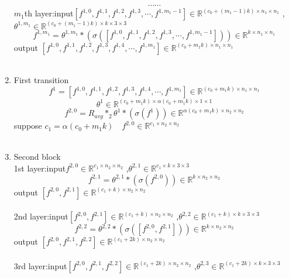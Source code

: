 \begin{enumerate}
\\ \hspace*{\fill} \\
$$\cdots\cdots$$
$m_1$th layer:\quad input$[f^{1,0},f^{1,1},f^{1,2},f^{1,3},\cdots,f^{1,m_1-1}] \in \mathbb{R}^{(c_0+(m_1-1)k)\times n_1\times n_1}$ ,$\theta^{1,m_1} \in \mathbb{R}^{ (c_0+(m_1-1)k)\times k\times3\times 3}$
$$ f^{1,m_1}=\theta^{1,m_1} \ast (\sigma([f^{1,0},f^{1,1},f^{1,2},f^{1,3},\cdots,f^{1,m_1-1}]))\in \mathbb{R}^{k\times n_1\times n_1}$$
\quad\quad\quad\quad\quad output $[f^{1,0},f^{1,1}, f^{1,2},f^{1,3},f^{1,4},\cdots,f^{1,m_1}] \in \mathbb{R}^{(c_0+m_1k)\times n_1\times n_1}$
\\ \hspace*{\fill} \\
\item First transition
$$f^1 = [f^{1,0},f^{1,1}, f^{1,2},f^{1,3},f^{1,4},\cdots,f^{1,m_1}] \in \mathbb{R}^{(c_0+m_1k)\times n_1\times n_1}$$
$$\theta^1 \in \mathbb{R}^{(c_0+m_1k)\times \alpha(c_0+m_1k)\times 1\times 1 }$$
$$f^{2,0}=R_{avg} \ast_2 \theta^{1} \ast (\sigma(f^1))\in \mathbb{R}^{\alpha(c_0+m_1k)\times n_2\times n_2}$$
suppose $c_1 = \alpha(c_0+m_1k)\quad f^{2,0}\in \mathbb{R}^{c_1\times n_2\times n_2}$
\\ \hspace*{\fill} \\
\item Second block\\
1st layer:\quad input$f^{2,0}\in \mathbb{R}^{c_1\times n_2\times n_2}$ ,$\theta^{2,1} \in \mathbb{R}^{c_1\times k\times3\times 3 }$
$$f^{2,1}=\theta^{2,1} \ast (\sigma(f^{2,0}))\in \mathbb{R}^{k\times n_2\times n_2}$$
\quad\quad\quad\quad\quad output $[f^{2,0},f^{2,1}] \in \mathbb{R}^{(c_1+k)\times n_2\times n_2}$
\\ \hspace*{\fill} \\
2nd layer:\quad input$[f^{2,0},f^{2,1}] \in \mathbb{R}^{(c_1+k)\times n_2\times n_2}$ ,$\theta^{2,2} \in \mathbb{R}^{(c_1+k)\times k\times 3\times 3}$
$$ f^{2,2}=\theta^{2,2} \ast (\sigma([f^{2,0},f^{2,1}]))\in \mathbb{R}^{k\times n_2\times n_2}$$
\quad\quad\quad\quad\quad output $[f^{2,0},f^{2,1}, f^{2,2}] \in \mathbb{R}^{(c_1+2k)\times n_2\times n_2}$
\\ \hspace*{\fill} \\
3rd layer:\quad input$[f^{2,0},f^{2,1},f^{2,2}] \in \mathbb{R}^{(c_1+2k)\times n_2\times n_2}$ ,$\theta^{2,3} \in \mathbb{R}^{(c_1+2k)\times k\times 3\times 3}$

\end{enumerate}
